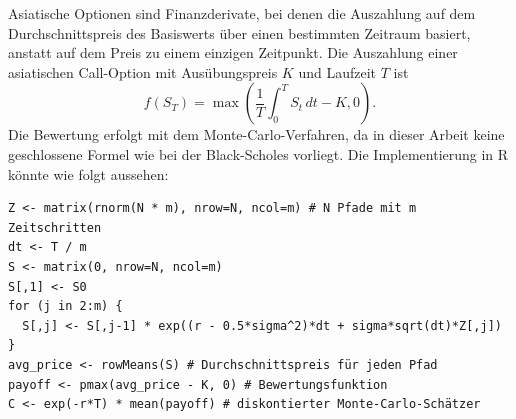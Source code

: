 \begin{bsp}
Asiatische Optionen sind Finanzderivate, bei denen die Auszahlung auf dem Durchschnittspreis
des Basiswerts über einen bestimmten Zeitraum basiert, anstatt auf dem Preis zu einem einzigen Zeitpunkt.
Die Auszahlung einer asiatischen Call-Option mit Ausübungspreis $K$ und Laufzeit $T$ ist
$$f(S_T) = \max\left(\frac{1}{T} \int_0^T S_t\,dt - K, 0\right).$$
Die Bewertung erfolgt mit dem Monte-Carlo-Verfahren, da in dieser Arbeit keine geschlossene Formel wie bei der Black-Scholes vorliegt.
Die Implementierung in R könnte wie folgt aussehen:

\begin{lstlisting}
Z <- matrix(rnorm(N * m), nrow=N, ncol=m) # N Pfade mit m Zeitschritten
dt <- T / m
S <- matrix(0, nrow=N, ncol=m)
S[,1] <- S0
for (j in 2:m) {
  S[,j] <- S[,j-1] * exp((r - 0.5*sigma^2)*dt + sigma*sqrt(dt)*Z[,j])
}
avg_price <- rowMeans(S) # Durchschnittspreis für jeden Pfad
payoff <- pmax(avg_price - K, 0) # Bewertungsfunktion
C <- exp(-r*T) * mean(payoff) # diskontierter Monte-Carlo-Schätzer
\end{lstlisting}

\end{bsp}